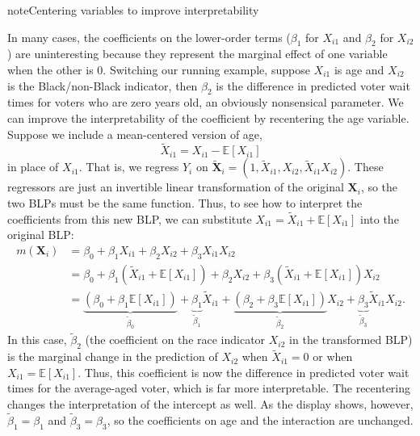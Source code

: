 \documentclass[
  13pt,
  letterpaper,
  DIV=11,
  numbers=noendperiod]{scrreprt}
\newcommand{\mb}{\bm}
\newcommand{\E}{\mathbb{E}}
\newcommand{\X}{\mb{X}}
\theoremstyle{plain}
\theoremstyle{plain}
\theoremstyle{definition}
\theoremstyle{definition}
\theoremstyle{remark}
\begin{document}
\begin{bookcallout}{note}{Centering variables to improve interpretability}

In many cases, the coefficients on the lower-order terms (\(\beta_1\)
for \(X_{i1}\) and \(\beta_2\) for \(X_{i2}\)) are uninteresting because
they represent the marginal effect of one variable when the other is 0.
Switching our running example, suppose \(X_{i1}\) is age and \(X_{i2}\)
is the Black/non-Black indicator, then \(\beta_2\) is the difference in
predicted voter wait times for voters who are zero years old, an
obviously nonsensical parameter. We can improve the interpretability of
the coefficient by recentering the age variable. Suppose we include a
mean-centered version of age, \[
\widetilde{X}_{i1} = X_{i1} - \E[X_{i1}]
\] in place of \(X_{i1}\). That is, we regress \(Y_i\) on
\(\widetilde{\X}_i = (1, \widetilde{X}_{i1}, X_{i2}, \widetilde{X}_{i1}X_{i2})\).
These regressors are just an invertible linear transformation of the
original \(\X_i\), so the two BLPs must be the same function. Thus, to
see how to interpret the coefficients from this new BLP, we can
substitute \(X_{i1} = \widetilde{X}_{i1} + \E[X_{i1}]\) into the
original BLP: \[
\begin{aligned}
m(\X_i) &= \beta_0 + \beta_1 X_{i1} + \beta_2 X_{i2} + \beta_3 X_{i1}X_{i2} \\
&= \beta_0 + \beta_1 (\widetilde{X}_{i1} + \E[X_{i1}]) + \beta_2 X_{i2} + \beta_3 (\widetilde{X}_{i1} + \E[X_{i1}])X_{i2} \\
&= \underbrace{(\beta_0 + \beta_1 \E[X_{i1}])}_{\widetilde{\beta}_0} + \underbrace{\beta_1}_{\widetilde{\beta}_1} \widetilde{X}_{i1} + \underbrace{(\beta_2 + \beta_3 \E[X_{i1}])}_{\widetilde{\beta}_2}X_{i2} + \underbrace{\beta_3}_{\widetilde{\beta}_3}\widetilde{X}_{i1}X_{i2}.
\end{aligned}
\] In this case, \(\widetilde{\beta}_2\) (the coefficient on the race
indicator \(X_{i2}\) in the transformed BLP) is the marginal change in
the prediction of \(X_{i2}\) when \(\widetilde{X}_{i1} = 0\) or when
\(X_{i1} = \E[X_{i1}]\). Thus, this coefficient is now the difference in
predicted voter wait times for the average-aged voter, which is far more
interpretable. The recentering changes the interpretation of the
intercept as well. As the display shows, however,
\(\widetilde{\beta}_1 = \beta_1\) and \(\widetilde{\beta}_3 = \beta_3\),
so the coefficients on age and the interaction are unchanged.

\end{bookcallout}
\end{document}
